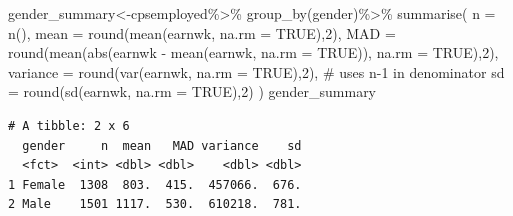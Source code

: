 \documentclass[
  letterpaper,
  DIV=11,
  numbers=noendperiod]{scrartcl}
\newenvironment{Shaded}{\begin{snugshade}}{\end{snugshade}}
\newcommand{\AttributeTok}[1]{\textcolor[rgb]{0.40,0.45,0.13}{#1}}
\newcommand{\CommentTok}[1]{\textcolor[rgb]{0.37,0.37,0.37}{#1}}
\newcommand{\ConstantTok}[1]{\textcolor[rgb]{0.56,0.35,0.01}{#1}}
\newcommand{\DecValTok}[1]{\textcolor[rgb]{0.68,0.00,0.00}{#1}}
\newcommand{\FunctionTok}[1]{\textcolor[rgb]{0.28,0.35,0.67}{#1}}
\newcommand{\NormalTok}[1]{\textcolor[rgb]{0.00,0.23,0.31}{#1}}
\newcommand{\OtherTok}[1]{\textcolor[rgb]{0.00,0.23,0.31}{#1}}
\newcommand{\SpecialCharTok}[1]{\textcolor[rgb]{0.37,0.37,0.37}{#1}}
\newcommand{\StringTok}[1]{\textcolor[rgb]{0.13,0.47,0.30}{#1}}
\begin{document}
\begin{Shaded}
\begin{Highlighting}[]
\NormalTok{gender\_summary}\OtherTok{\textless{}{-}}\NormalTok{cpsemployed}\SpecialCharTok{\%\textgreater{}\%}
  \FunctionTok{group\_by}\NormalTok{(gender)}\SpecialCharTok{\%\textgreater{}\%}
  \FunctionTok{summarise}\NormalTok{(}
     \AttributeTok{n =} \FunctionTok{n}\NormalTok{(),}
    \AttributeTok{mean =} \FunctionTok{round}\NormalTok{(}\FunctionTok{mean}\NormalTok{(earnwk, }\AttributeTok{na.rm =} \ConstantTok{TRUE}\NormalTok{),}\DecValTok{2}\NormalTok{),}
    \AttributeTok{MAD =} \FunctionTok{round}\NormalTok{(}\FunctionTok{mean}\NormalTok{(}\FunctionTok{abs}\NormalTok{(earnwk }\SpecialCharTok{{-}} \FunctionTok{mean}\NormalTok{(earnwk, }\AttributeTok{na.rm =} \ConstantTok{TRUE}\NormalTok{)), }\AttributeTok{na.rm =} \ConstantTok{TRUE}\NormalTok{),}\DecValTok{2}\NormalTok{),}
    \AttributeTok{variance =} \FunctionTok{round}\NormalTok{(}\FunctionTok{var}\NormalTok{(earnwk, }\AttributeTok{na.rm =} \ConstantTok{TRUE}\NormalTok{),}\DecValTok{2}\NormalTok{),   }\CommentTok{\# uses n{-}1 in denominator}
    \AttributeTok{sd =} \FunctionTok{round}\NormalTok{(}\FunctionTok{sd}\NormalTok{(earnwk, }\AttributeTok{na.rm =} \ConstantTok{TRUE}\NormalTok{),}\DecValTok{2}\NormalTok{)}
\NormalTok{  )}
\NormalTok{gender\_summary}
\end{Highlighting}
\end{Shaded}

\begin{verbatim}
# A tibble: 2 x 6
  gender     n  mean   MAD variance    sd
  <fct>  <int> <dbl> <dbl>    <dbl> <dbl>
1 Female  1308  803.  415.  457066.  676.
2 Male    1501 1117.  530.  610218.  781.
\end{verbatim}

\begin{Shaded}
\end{Shaded}
\end{document}
